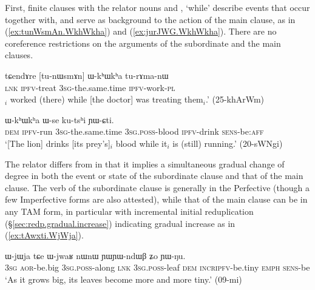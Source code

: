  First, finite clauses with the relator nouns   and , `while' describe events that occur together with, and serve as background to the action of the main clause, as in (\ref{ex:tunWsmAn.WkhWkha}) and (\ref{ex:jurJWG.WkhWkha}).  There are no coreference restrictions on the arguments of the subordinate and the main clauses.

\begin{exe}
\ex \label{ex:tunWsmAn.WkhWkha}
\gll tɕendɤre [tu-nɯsmɤn] ɯ-kʰɯkʰa tu-rɤma-nɯ  \\
\textsc{lnk} \textsc{ipfv}-treat \textsc{3sg}-the.same.time \textsc{ipfv}-work-\textsc{pl} \\
$_i$ worked (there) while [the doctor] was treating them$_i$.' (25-khArWm)
\end{exe}

\begin{exe}
\ex \label{ex:jurJWG.WkhWkha}
 ɯ-kʰɯkʰa ɯ-se ku-tsʰi ɲɯ-ɕti.  \\
\textsc{dem} \textsc{ipfv}-run \textsc{3sg}-the.same.time \textsc{3sg}.\textsc{poss}-blood \textsc{ipfv}-drink  \textsc{sens}-be:\textsc{aff} \\
\glt `[The lion] drinks [its prey's]$_i$ blood while it$_i$ is (still) running.' (20-sWNgi)
\end{exe}

The relator  differs from  in that it implies a simultaneous gradual change of degree in both the event or state of the subordinate clause and that of the main clause. The verb of the subordinate clause is generally in the Perfective (though a few Imperfective forms are also attested), while that of the main clause can be in any TAM form, in particular with incremental initial reduplication (§\ref{sec:redp.gradual.increase}) indicating gradual increase as in (\ref{ex:tAwxti.WjWja}).

\begin{exe}
\ex \label{ex:tAwxti.WjWja}
 ɯ-jɯja tɕe ɯ-jwaʁ nɯnɯ ɲɯ\redp{}ɲɯ-ndɯβ ʑo ɲɯ-ŋu.  	\\
\textsc{3sg} \textsc{aor}-be.big  \textsc{3sg}.\textsc{poss}-along \textsc{lnk} \textsc{3sg}.\textsc{poss}-leaf \textsc{dem} \textsc{incr\redp{}ipfv}-be.tiny \textsc{emph} \textsc{sens}-be \\
\glt `As it grows big, its leaves become more and more tiny.' (09-mi)
\end{exe}

